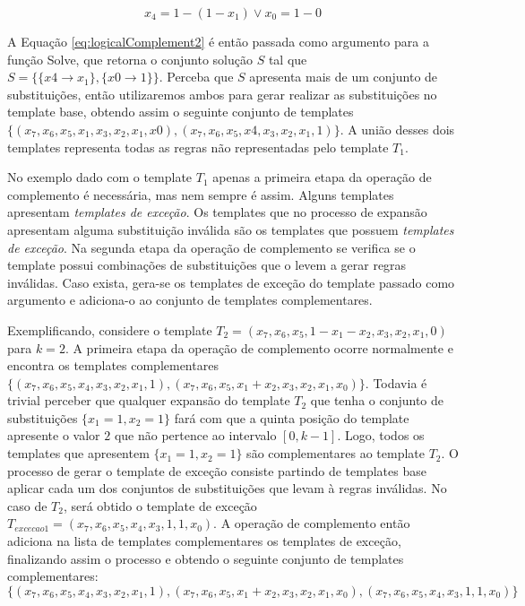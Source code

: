 	\begin{equation}
	x_4 = 1 - (1 - x_1) \vee  
	x_0 = 1 - 0
	\label{eq:logicalComplement2}
	\end{equation}

	A Equação \ref{eq:logicalComplement2} é então passada como argumento para a função Solve, que retorna o conjunto solução $S$ tal que $S = \{\{x4 \to x_1\},\{x0\to 1\}\}$. Perceba que $S$ apresenta mais de um conjunto de substituições, então utilizaremos ambos para gerar realizar as substituições no template base, obtendo assim o seguinte conjunto de templates $\{(x_7,x_6,x_5,x_1,x_3,x_2,x_1,x0),(x_7,x_6,x_5,x4,x_3,x_2,x_1,1)\}$. A união desses dois templates representa todas as regras não representadas pelo template $T_1$.

	No exemplo dado com o template $T_1$ apenas a primeira etapa da operação de complemento é necessária, mas nem sempre é assim. Alguns templates apresentam \textit{templates de exceção}. Os templates que no processo de expansão apresentam alguma substituição inválida são os templates que possuem \textit{templates de exceção}. Na segunda etapa da operação de complemento se verifica se o template possui combinações de substituições que o levem a gerar regras inválidas. Caso exista, gera-se os templates de exceção do template passado como argumento e adiciona-o ao conjunto de templates complementares.

	Exemplificando, considere o template $T_2 = (x_7, x_6, x_5, 1 - x_1 - x_2, x_3, x_2, x_1, 0)$ para $k=2$. A primeira etapa da operação de complemento ocorre normalmente e encontra os templates complementares $\{(x_7, x_6, x_5, x_4, x_3, x_2, x_1, 1),(x_7, x_6, x_5, x_1 + x_2, x_3, x_2, x_1, x_0)\}$. Todavia é trivial perceber que qualquer expansão do template $T_2$ que tenha o conjunto de substituições $\{x_1 = 1, x_2 = 1\}$ fará com que a quinta posição do template apresente o valor $2$ que não pertence ao intervalo $[0,k-1]$. Logo, todos os templates que apresentem $\{x_1 = 1, x_2 = 1\}$ são complementares ao template $T_2$. O processo de gerar o template de exceção consiste partindo de templates base aplicar cada um dos conjuntos de substituições que levam à regras inválidas. No caso de $T_2$, será obtido o template de exceção $T_{excecao 1} = (x_7, x_6, x_5, x_4, x_3, 1, 1, x_0)$. A operação de complemento então adiciona na lista de templates complementares os templates de exceção, finalizando assim o processo e obtendo o seguinte conjunto de templates complementares:
	\begin{equation}
	\{(x_7, x_6, x_5, x_4, x_3, x_2, x_1, 1),(x_7, x_6, x_5, x_1 + x_2, x_3, x_2, x_1, x_0),(x_7, x_6, x_5, x_4, x_3, 1, 1, x_0)\}
	\label{eq:complementionSet}
	\end{equation}

